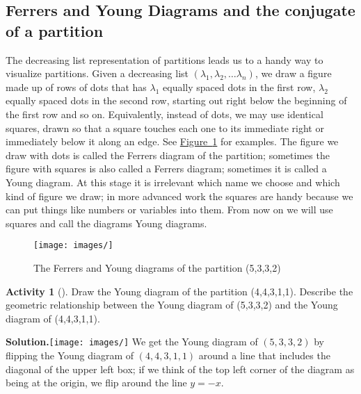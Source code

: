 \documentclass[10pt,]{book}
\theoremstyle{plain}
\theoremstyle{definition}
\newtheorem{activity}[project]{Activity}
\numberwithin{equation}{chapter}
\begin{document}
\subsection[{Ferrers and Young Diagrams and the conjugate of a partition}]{Ferrers and Young Diagrams and the conjugate of a partition}\label{subsection-15}
The decreasing list representation of partitions leads us to a handy way to visualize partitions. Given a decreasing list \((\lambda_1,\lambda_2,\ldots \lambda_n)\), we draw a figure made up of rows of dots that has \(\lambda_1\) equally spaced dots in the first row, \(\lambda_2\) equally spaced dots in the second row, starting out right below the beginning of the first row and so on. Equivalently, instead of dots, we may use identical squares, drawn so that a square touches each one to its immediate right or immediately below it along an edge. See \hyperref[FerrersYoung]{Figure~\ref{FerrersYoung}} for examples. The figure we draw with dots is called the Ferrers diagram of the partition; sometimes the figure with squares is also called a Ferrers diagram; sometimes it is called a Young diagram. At this stage it is irrelevant which name we choose and which kind of figure we draw; in more advanced work the squares are handy because we can put things like numbers or variables into them. From now on we will use squares and call the diagrams Young diagrams.%
\begin{figure}
\centering
\texttt{[image: images/]}
\caption{The Ferrers and Young diagrams of the partition (5,3,3,2)\label{FerrersYoung}}
\end{figure}
\begin{activity}[]\label{activity-52}
Draw the Young diagram of the partition (4,4,3,1,1). Describe the geometric relationship between the Young diagram of (5,3,3,2) and the Young diagram of (4,4,3,1,1).%
\par\medskip\noindent%
\textbf{Solution.}\quad \texttt{[image: images/]}
 We get the Young diagram of \((5,3,3,2)\) by flipping the Young diagram of \((4,4,3,1,1)\) around a line that includes the diagonal of the upper left box; if we think of the top left corner of the diagram as being at the origin, we flip around the line \(y=-x\).%
\end{activity}
\end{document}
